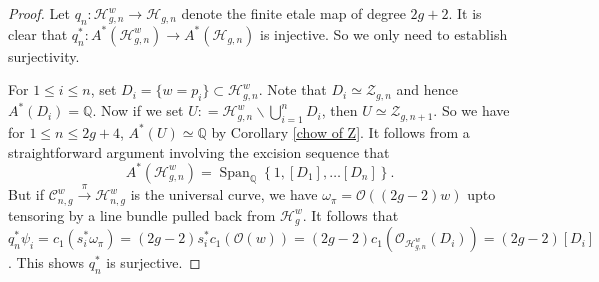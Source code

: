 \documentclass[11pt]{amsart}
\theoremstyle{definition}
\begin{document}
\begin{proof}
    Let $q_n :\mathcal H^w_{g,n} \rightarrow \mathcal H_{g,n}$ denote the finite etale map of degree $2g+2$. It is clear that $q^*_n : A^* (\mathcal H^w_{g,n}) \rightarrow A^*(\mathcal H_{g,n})$ is injective. So we only need to establish surjectivity. 

\noindent For $1\leq i \leq n$, set $D_i = \{w=p_i \}\subset \mathcal H^w_{g,n}$. Note that $D_i \simeq \mathcal Z_{g,n}$ and hence $A^* (D_i)=\mathbb Q$. Now if we set $U: = \mathcal H^w_{g,n}\backslash \bigcup_{i=1}^n D_i$, then $U\simeq \mathcal Z_{g,n+1}$. So we have for $1\leq n\leq 2g+4$, $A^*(U) \simeq \mathbb Q$ by Corollary \ref{chow of Z}. It follows from a straightforward argument involving the excision sequence that \begin{equation*}
    A^* (\mathcal H^w_{g,n}) =\operatorname{Span}_{\mathbb Q} \left \{ 1, [D_1],\dots [D_n] \right \}. 
\end{equation*}
But if $\mathcal C^w_{n,g} \xrightarrow{\pi} \mathcal H^w_{n,g} $ is the universal curve, we have $\omega_\pi = \mathcal O((2g-2)w)$ upto tensoring by a line bundle pulled back from $\mathcal H^w_g$. It follows that  $q_n^* \psi_i= c_1(s_i^* \omega_\pi) =(2g-2)s_i^* c_1(\mathcal O(w))= (2g-2)c_1(\mathcal O_{\mathcal H^{w}_{g,n}}(D_i))=(2g-2)[D_i]$. This shows $q_n^*$ is surjective. 



\end{proof}
\end{document}
